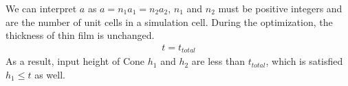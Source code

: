 \documentclass[12pt]{article}
\numberwithin{equation}{section}
\numberwithin{equation}{section}
\begin{document}
\begin{outline}[enumerate]
We can interpret $a$ as $a = n_1 a_1 = n_2 a_2$, $n_1$ and $n_2$ must be positive integers and are the number of unit cells in a simulation cell. During the optimization, the thickness of thin film is unchanged. 
\begin{align}
t=t_{total}
\end {align}
As a result, input height of Cone $h_1$ and $h_2$ are less than $t_{total}$, which is satisfied $h_1 \leq t$ as well.
%
% 
%

\end{outline}
\end{document}
